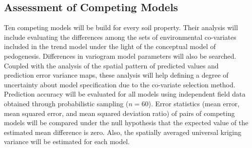 \subsection{Assessment of Competing Models}

Ten competing models will be build for every soil property. Their analysis will include evaluating the differences among the sets of environmental co-variates included in the trend model under the light of the conceptual model of pedogenesis. Differences in variogram model parameters will also be searched. Coupled with the analysis of the spatial pattern of predicted values and prediction error variance maps, these analysis will help defining a degree of uncertainty about model specification due to the co-variate selection method. Prediction accuracy will be evaluated for all models using independent field data obtained through probabilistic sampling ($n=60$). Error statistics (mean error, mean squared error, and mean squared deviation ratio) of pairs of competing models will be compared under the null hypothesis that the expected value of the estimated mean difference is zero. Also, the spatially averaged universal kriging variance will be estimated for each model.